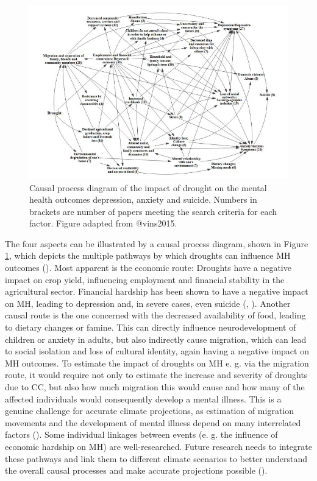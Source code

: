 \documentclass[
]{krantz}
\begin{document}
\begin{figure}

{\centering \includegraphics[width=0.8\linewidth]{work/12-mentalhealth/figures/drought_impact} 

}

\caption{Causal process diagram of the impact of drought on the mental health outcomes depression, anxiety and suicide. Numbers in brackets are number of papers meeting the search criteria for each factor. Figure adapted from @vins2015.}\label{fig:impactDrought}
\end{figure}

The four aspects can be illustrated by a causal process diagram, shown in Figure \ref{fig:impactDrought}, which depicts the multiple pathways by which droughts can influence MH outcomes (\citet{vins2015}). Most apparent is the economic route: Droughts have a negative impact on crop yield, influencing employment and financial stability in the agricultural sector. Financial hardship has been shown to have a negative impact on MH, leading to depression and, in severe cases, even suicide (\citet{carleton2017}, \citet{edwards2015}). Another causal route is the one concerned with the decreased availability of food, leading to dietary changes or famine. This can directly influence neurodevelopment of children or anxiety in adults, but also indirectly cause migration, which can lead to social isolation and loss of cultural identity, again having a negative impact on MH outcomes. To estimate the impact of droughts on MH e. g. via the migration route, it would require not only to estimate the increase and severity of droughts due to CC, but also how much migration this would cause and how many of the affected individuals would consequently develop a mental illness. This is a genuine challenge for accurate climate projections, as estimation of migration movements and the development of mental illness depend on many interrelated factors (\citet{mazhin2020}). Some individual linkages between events (e. g. the influence of economic hardship on MH) are well-researched. Future research needs to integrate these pathways and link them to different climate scenarios to better understand the overall causal processes and make accurate projections possible (\citet{vins2015}).
\end{document}
